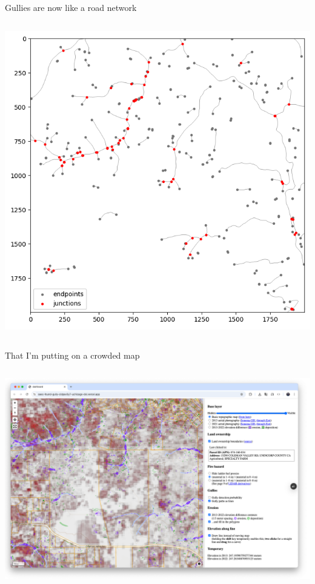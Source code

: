 \documentclass[aspectratio=169]{beamer}
\begin{document}
\begin{frame}{Gullies are now like a road network}
\vspace{0.15 cm}
\begin{columns}
\includegraphics[width=\linewidth]{img/skeletonized-graph.png}
\end{columns}
\end{frame}

\begin{frame}{That I'm putting on a crowded map}
\vspace{0.15 cm}
\begin{columns}
\includegraphics[width=\linewidth]{img/crowded-map.png}
\end{columns}
\end{frame}
\end{document}
